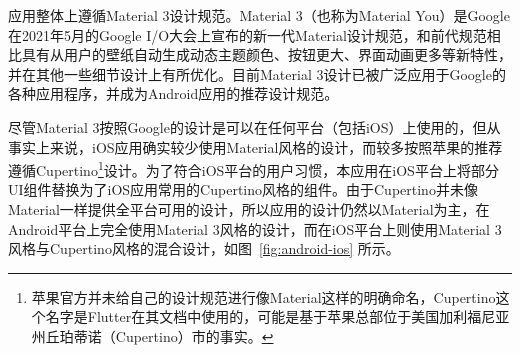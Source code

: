 应用整体上遵循Material 3设计规范\cite{MaterialDesign}。Material 3（也称为Material You）是Google在2021年5月的Google I/O大会上宣布的新一代Material设计规范，和前代规范相比具有从用户的壁纸自动生成动态主题颜色、按钮更大、界面动画更多等新特性，并在其他一些细节设计上有所优化。目前Material 3设计已被广泛应用于Google的各种应用程序，并成为Android应用的推荐设计规范。

尽管Material 3按照Google的设计是可以在任何平台（包括iOS）上使用的，但从事实上来说，iOS应用确实较少使用Material风格的设计，而较多按照苹果的推荐遵循Cupertino\footnote{苹果官方并未给自己的设计规范进行像Material这样的明确命名，Cupertino这个名字是Flutter在其文档中使用的，可能是基于苹果总部位于美国加利福尼亚州丘珀蒂诺（Cupertino）市的事实。}设计。为了符合iOS平台的用户习惯，本应用在iOS平台上将部分UI组件替换为了iOS应用常用的Cupertino风格的组件。由于Cupertino并未像Material一样提供全平台可用的设计，所以应用的设计仍然以Material为主，在Android平台上完全使用Material 3风格的设计，而在iOS平台上则使用Material 3风格与Cupertino风格的混合设计，如图~\ref{fig:android-ios} 所示。

